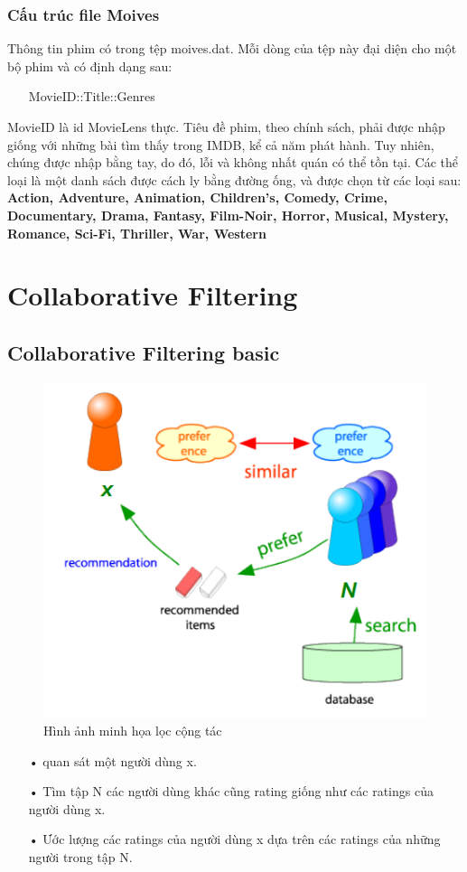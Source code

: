 \documentclass[a4paper,10pt]{report}
\begin{document}
\subsection{Cấu trúc file Moives}
Thông tin phim có trong tệp moives.dat. Mỗi dòng của tệp này đại diện cho một bộ phim và có định dạng sau:
\begin{itemize}
\item[] MovieID::Title::Genres
\end{itemize}
MovieID là id MovieLens thực. Tiêu đề phim, theo chính sách, phải được nhập giống với những bài tìm thấy trong IMDB, kể cả năm phát hành. Tuy nhiên, chúng được nhập bằng tay, do đó, lỗi và không nhất quán có thể tồn tại. Các thể loại là một danh sách được cách ly bằng đường ống, và được chọn từ các loại sau: \textbf{Action, Adventure, Animation, Children's, Comedy, Crime, Documentary, Drama, Fantasy, Film-Noir, Horror, Musical, Mystery, Romance, Sci-Fi, Thriller, War, Western}
\chapter{Collaborative Filtering}
\section{Collaborative Filtering basic}
\begin{figure}[h]
\begin{center}
\includegraphics[width =0.6 \textwidth]{CF.png}
\caption{Hình ảnh minh họa lọc cộng tác}
\end{center}
\end{figure}
\begin{itemize}
\item[•] quan sát một người dùng x.
\item[•] Tìm tập N các người dùng khác cũng rating giống như các ratings của người dùng x.
\item[•] Ước lượng các ratings của người dùng x dựa trên các ratings của những người trong tập N.
\end{itemize}
\end{document}
